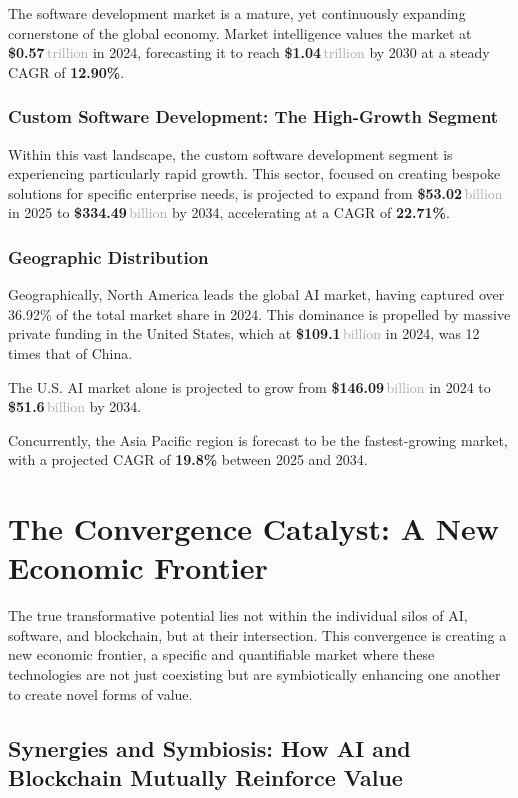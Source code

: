 \documentclass[11pt,a4paper]{report}
\newcommand{\marketvalue}[2]{\textcolor{trust}{\textbf{\$#1}}\,\textcolor{darkgray}{#2}}
\newcommand{\cagr}[1]{\textcolor{sun}{\textbf{#1\%}}}
\begin{document}
The software development market is a mature, yet continuously expanding cornerstone of the global economy. Market intelligence values the market at \marketvalue{0.57}{trillion} in 2024, forecasting it to reach \marketvalue{1.04}{trillion} by 2030 at a steady CAGR of \cagr{12.90}.

\subsection{Custom Software Development: The High-Growth Segment}
Within this vast landscape, the custom software development segment is experiencing particularly rapid growth. This sector, focused on creating bespoke solutions for specific enterprise needs, is projected to expand from \marketvalue{53.02}{billion} in 2025 to \marketvalue{334.49}{billion} by 2034, accelerating at a CAGR of \cagr{22.71}.

\subsection{Geographic Distribution}
Geographically, North America leads the global AI market, having captured over 36.92\% of the total market share in 2024. This dominance is propelled by massive private funding in the United States, which at \marketvalue{109.1}{billion} in 2024, was 12 times that of China.

The U.S. AI market alone is projected to grow from \marketvalue{146.09}{billion} in 2024 to \marketvalue{51.6}{billion} by 2034.

Concurrently, the Asia Pacific region is forecast to be the fastest-growing market, with a projected CAGR of \cagr{19.8} between 2025 and 2034.

\chapter{The Convergence Catalyst: A New Economic Frontier}

The true transformative potential lies not within the individual silos of AI, software, and blockchain, but at their intersection. This convergence is creating a new economic frontier, a specific and quantifiable market where these technologies are not just coexisting but are symbiotically enhancing one another to create novel forms of value.

\section{Synergies and Symbiosis: How AI and Blockchain Mutually Reinforce Value}
\end{document}
